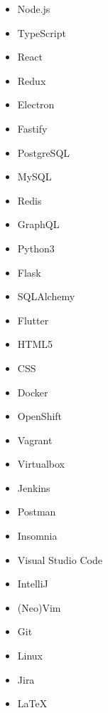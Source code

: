 

\begin{multicols}{5}
	\begin{itemize}
		\item Node.js
		\item TypeScript
		\item React
		\item Redux
		\item Electron
		\item Fastify
		\item PostgreSQL
		\item MySQL
		\item Redis
		\item GraphQL
		\item Python3
		\item Flask
		\item SQLAlchemy
		\item Flutter
		\item HTML5
		\item CSS
		\item Docker
		\item OpenShift
		\item Vagrant
		\item Virtualbox
		\item Jenkins
		\item Postman
		\item Insomnia
		\item Visual Studio Code
		\item IntelliJ
		\item (Neo)Vim
		\item Git
		\item Linux
		\item Jira
		\item LaTeX
	\end{itemize}
\end{multicols}
